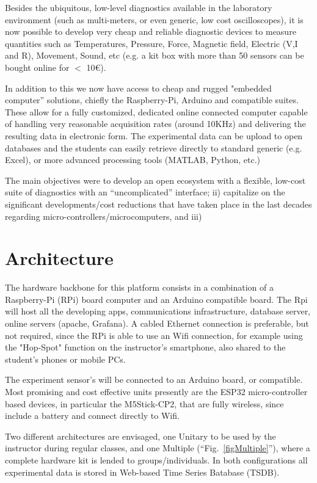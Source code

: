 \documentclass[conference]{IEEEtran}
\begin{document}
Besides the ubiquitous, low-level diagnostics available in the laboratory environment (such as multi-meters, or even generic, low cost oscilloscopes), it is now possible to develop very cheap and reliable diagnostic devices to measure quantities such as  
Temperatures, Pressure, Force, Magnetic field, Electric (V,I and R), Movement, Sound, etc (e.g. a kit box with more than 50 sensors can be bought online for $<$ 10€).

In addition to this we now have access to cheap and rugged "embedded computer” solutions, chiefly the Raspberry-Pi, Arduino\cite{b2} and compatible suites.
These allow for a fully customized, dedicated online connected computer capable of handling very reasonable acquisition rates (around 10KHz) 
and delivering the resulting data in electronic form. The experimental data can be upload to open databases and the students can easily retrieve 
 directly to standard generic (e.g. Excel), or more advanced processing tools (MATLAB, Python, etc.)

The main objectives were to develop an open ecosystem with a flexible, low-cost suite of diagnostics with an ``uncomplicated'' interface; ii) capitalize on the significant developments/cost reductions that have taken place in the last decades regarding micro-controllers/microcomputers, and iii)

\section{Architecture}
The hardware backbone for this platform consists in a combination of a Raspberry-Pi (RPi) board computer and an Arduino compatible board. 
The Rpi will host all the developing  apps, communications infrastructure, database server, online servers (apache, Grafana). 
 A cabled Ethernet connection is preferable, but not  required, since the RPi is able to use an Wifi connection, 
 for example using the "Hop-Spot" function on the instructor’s smartphone, also shared to the student’s phones or mobile PCs.

 The experiment sensor's will be connected to an Arduino board, or compatible.
 Most promising and cost effective units presently are the ESP32 micro-controller based devices, in particular the M5Stick-CP2,
 that are fully wireless, since include a battery and connect directly to Wifi.

 Two different architectures are envisaged, one Unitary to be used by the instructor during regular classes, and one Multiple (``Fig.~\ref{figMultiple}''),
 where a complete hardware kit is lended to groups/individuals. 
 In both configurations all experimental data is stored in Web-based Time Series Batabase\cite{b3} (TSDB).
 
\end{document}
